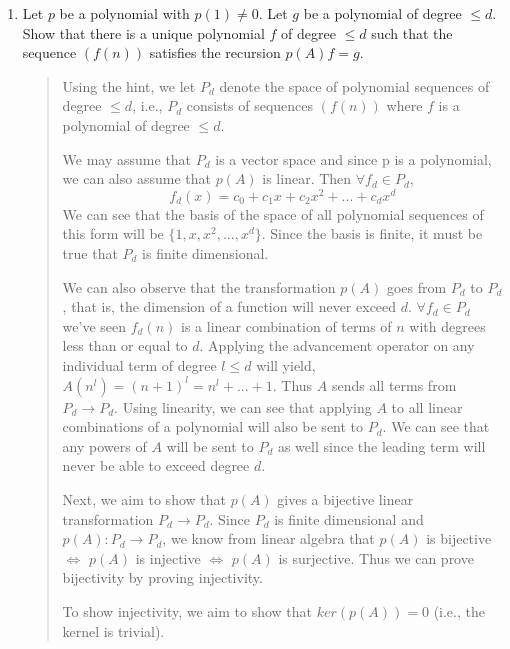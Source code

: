 \documentclass[letter]{article}
\begin{document}
\begin{enumerate}
		\newpage
        \item 
        Let $p$ be a polynomial with $p(1) \neq 0$. Let $g$ be a polynomial of degree $\leq d$. Show that there is a unique polynomial $f$ of degree $\leq d$ such that the sequence $(f(n))$ satisfies the recursion $p(A)f = g$.
		\begin{quote}
		
		Using the hint, we let $P_d$ denote the space of polynomial sequences of degree $\leq d$, i.e., $P_d$ consists of sequences $(f(n))$ where $f$ is a polynomial of degree $\leq d$. 
		
		We may assume that $P_d$ is a vector space and since p is a polynomial, we can also assume that $p(A)$ is linear. Then $\forall f_d \in P_d$,
		\[
            f_d(x) = c_0 + c_1 x + c_2 x^2 + ... + c_d x^d
		\]
		We can see that the basis of the space of all polynomial sequences of this form will be $\{ 1, x , x^2,...,x^d \}$. Since the basis is finite, it must be true that $P_d$ is finite dimensional.
		
		We can also observe that the transformation $p(A)$ goes from $P_d$ to $P_d$, that is, the dimension of a function will never exceed $d$. $\forall f_d \in P_d$ we've seen $f_d(n)$ is a linear combination of terms of $n$ with degrees less than or equal to $d$. Applying the advancement operator on any individual term of degree $l \leq d$ will yield, $A(n^l) = (n+1)^l = n^l + ... + 1$. Thus $A$ sends all terms from $P_d \to P_d$. Using linearity, we can see that applying $A$ to all linear combinations of a polynomial will also be sent to $P_d$. We can see that any powers of $A$ will be sent to $P_d$ as well since the leading term will never be able to exceed degree $d$.
		
		Next, we aim to show that $p(A)$ gives a bijective linear transformation $P_d \to P_d$. Since $P_d$ is finite dimensional and $p(A): P_d \to P_d$, we know from linear algebra that $p(A)$ is bijective $\iff$ $p(A)$ is injective $\iff$ $p(A)$ is surjective. Thus we can prove bijectivity by proving injectivity.
		
		To show injectivity, we aim to show that $ker(p(A)) = 0$ (i.e., the kernel is trivial).
		

\end{quote}
\end{enumerate}
\end{document}
